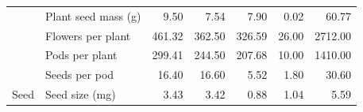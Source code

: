 \begin{table}[ht]
\begin{tabular}{l|l|r|r|r|r|r}
\cline{2-7}
 & Plant seed mass (g) & 9.50 & 7.54 & 7.90 & 0.02 & 60.77\\
\cline{2-7}
 & Flowers per plant & 461.32 & 362.50 & 326.59 & 26.00 & 2712.00\\
\cline{2-7}
 & Pods per plant & 299.41 & 244.50 & 207.68 & 10.00 & 1410.00\\
\cline{2-7}
 & Seeds per pod & 16.40 & 16.60 & 5.52 & 1.80 & 30.60\\
\cline{2-7}
\multirow{-14}{*}{\raggedright\arraybackslash Seed} & Seed size (mg) & 3.43 & 3.42 & 0.88 & 1.04 & 5.59\\
\hline
\end{tabular}

\label{tab:dataSummary}
\end{table}

% 
